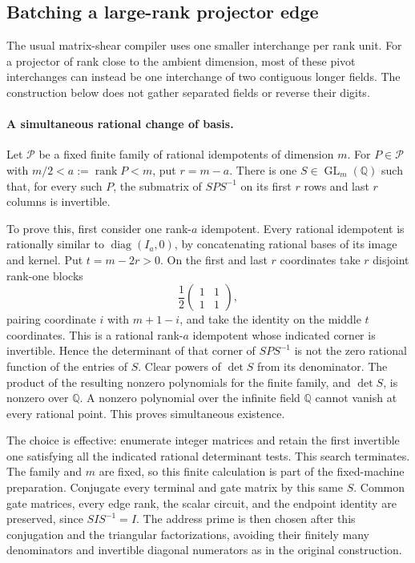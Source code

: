\subsection{Batching a large-rank projector edge}
\label{sec:projector-batching}

The usual matrix-shear compiler uses one smaller interchange per rank
unit. For a projector of rank close to the ambient dimension, most of
these pivot interchanges can instead be one interchange of two
contiguous longer fields. The construction below does not gather
separated fields or reverse their digits.

\paragraph{A simultaneous rational change of basis.}
Let $\mathcal P$ be a fixed finite family of rational idempotents of
dimension $m$. For $P\in\mathcal P$ with
$m/2<a:=\operatorname{rank}P<m$, put $r=m-a$. There is one
$S\in\operatorname{GL}_m(\mathbb Q)$ such that, for every such $P$,
the submatrix of $SPS^{-1}$ on its first $r$ rows and last $r$ columns
is invertible.

To prove this, first consider one rank-$a$ idempotent. Every rational
idempotent is rationally similar to $\operatorname{diag}(I_a,0)$,
by concatenating rational bases of its image and kernel. Put
$t=m-2r>0$. On the first and last $r$ coordinates take $r$ disjoint
rank-one blocks
\[
 \frac12\begin{pmatrix}1&1\\1&1\end{pmatrix},
\]
pairing coordinate $i$ with $m+1-i$, and take the identity on the middle
$t$ coordinates. This is a rational rank-$a$ idempotent whose indicated
corner is invertible. Hence the determinant of that corner of $SPS^{-1}$
is not the zero rational function of the entries of $S$. Clear powers
of $\det S$ from its denominator. The product of the resulting nonzero
polynomials for the finite family, and $\det S$, is nonzero over
$\mathbb Q$. A nonzero polynomial over the infinite field $\mathbb Q$
cannot vanish at every rational point. This proves simultaneous existence.

The choice is effective: enumerate integer matrices and retain the first
invertible one satisfying all the indicated rational determinant tests.
This search terminates. The family and $m$ are fixed, so this finite
calculation is part of the fixed-machine preparation. Conjugate every
terminal and gate matrix by this same $S$. Common gate matrices,
every edge rank, the scalar circuit, and the endpoint identity are
preserved, since $SIS^{-1}=I$. The address prime is then chosen after
this conjugation and the triangular factorizations, avoiding their
finitely many denominators and invertible diagonal numerators as in the
original construction.

